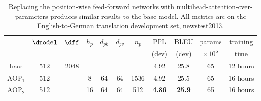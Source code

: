 \documentclass{article}
\begin{document}
\begin{table}[h]
\caption{Replacing the position-wise feed-forward networks with multihead-attention-over-parameters produces similar results to the base model.  All metrics are on the English-to-German translation development set, newstest2013.}
\label{tab:parameter_attention}
\begin{center}
\vspace{-2mm}
\begin{tabular}{c|cccccc|cccc}
\hline\rule{0pt}{2.0ex}
 & \multirow{2}{*}{$\dmodel$} & \multirow{2}{*}{$\dff$} &
\multirow{2}{*}{$h_p$} & \multirow{2}{*}{$d_{pk}$} & \multirow{2}{*}{$d_{pv}$} &
 \multirow{2}{*}{$n_p$} &
 PPL & BLEU & params & training\\
 & & & & & &  & (dev) & (dev) & $\times10^6$ & time \\
\hline\rule{0pt}{2.0ex}
base & 512 & 2048 & & & & & 4.92 & 25.8 & 65 & 12 hours\\
\hline\rule{0pt}{2.0ex}
AOP$_1$ & 512 & & 8 & 64 & 64 & 1536 & 4.92& 25.5  & 65 & 16 hours\\
AOP$_2$ & 512 & & 16 & 64 & 64 & 512 & \textbf{4.86} & \textbf{25.9}  & 65 & 16 hours \\
\hline
\end{tabular}
\end{center}
\end{table}
\end{document}
